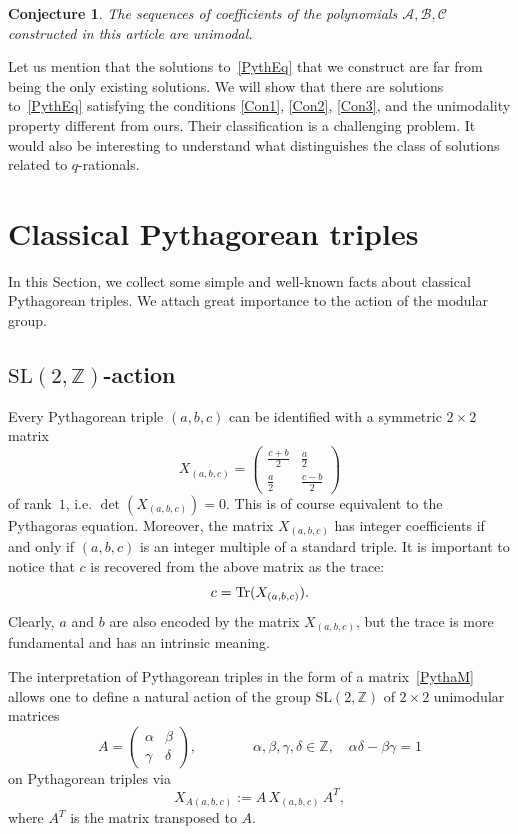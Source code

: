 \documentclass{article}[12pt]
\theoremstyle{plain}
\newtheorem*{conj}{Conjecture}
\theoremstyle{definition}
\newcommand{\Z}{\mathbb{Z}}
\newcommand{\A}{\mathcal{A}}
\newcommand{\B}{\mathcal{B}}
\newcommand{\cC}{\mathcal{C}}
\newcommand{\Tr}{\textup{Tr}}
\newcommand{\SL}{\mathrm{SL}}
\def\a{\alpha}
\def\b{\beta}
\def\d{\delta}
\def\g{\gamma}
\begin{document}
\begin{conj}
The  sequences of coefficients of the polynomials $\A,\B,\cC$
constructed in this article are unimodal.
\end{conj}


Let us mention that the solutions to~\eqref{PythEq} that we construct are
far from being the only existing solutions.
We will show that there are solutions to~\eqref{PythEq} 
satisfying the conditions \ref{Con1}, \ref{Con2}, \ref{Con3}, and the unimodality property
different from ours.
Their classification is a challenging problem.
It would also be interesting to understand what distinguishes 
the class of solutions related to $q$-rationals.

\section{Classical Pythagorean triples}

In this Section, we collect some simple and well-known facts about 
classical Pythagorean triples.
We attach great importance to the action of the modular group.

\subsection{$\SL(2,\Z)$-action}

Every Pythagorean triple $(a,b,c)$ can be identified with a symmetric
$2\times2$ matrix
\begin{equation}
\label{PythaM}
X_{(a,b,c)}=
\begin{pmatrix}
\frac{c+b}{2}&\frac{a}{2}\\[4pt]
\frac{a}{2}&\frac{c-b}{2}
\end{pmatrix}
\end{equation}
of rank~$1$, i.e. $\det(X_{(a,b,c)})=0$.
This is of course equivalent to the Pythagoras equation.
Moreover, the matrix $X_{(a,b,c)}$ has integer coefficients
if and only if $(a,b,c)$ is an integer multiple of a standard triple.
It is important to notice that $c$ is recovered from the above matrix as
the trace:
$$
c=\Tr(X_{(a,b,c)}).
$$
Clearly, $a$ and $b$ are also encoded by the matrix $X_{(a,b,c)}$,
but the trace is more fundamental and has an intrinsic meaning.

The interpretation of Pythagorean triples in the form of a matrix~\eqref{PythaM} 
allows one to define a natural action of
the group $\SL(2,\Z)$ of $2\times2$ unimodular matrices
$$
A=\begin{pmatrix}
\a&\b\\%
\g&\d
\end{pmatrix},
\qquad\qquad
\a,\b,\g,\d\in\Z,
\quad
\a\d-\b\g=1
$$
on Pythagorean triples via
\begin{equation}
\label{LFAct}
X_{A(a,b,c)}:=
A\,X_{(a,b,c)}\,A^T,
\end{equation}
where $A^T$ is the matrix transposed to $A$.
\end{document}
